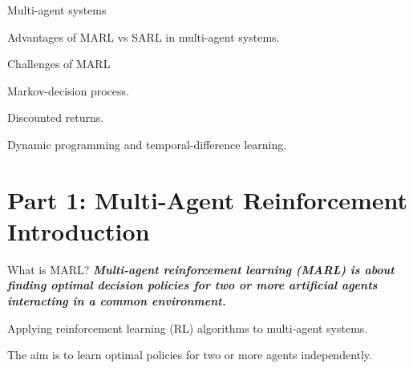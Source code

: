 

\leoslide

\subtitle{Introduction}


\maketitle

\introslide

\begin{frame}{\outline}
    \vspace{10pt}
    \vspace{5pt}
    \blist
        \item Multi-agent systems
        \item Advantages of MARL vs SARL in multi-agent systems.
        \item Challenges of MARL   
    \elist
    \vspace{10pt}
    \vspace{5pt}
    \blist
        \item Markov-decision process.
        \item Discounted returns.
        \item Dynamic programming and temporal-difference learning.
    \elist
\end{frame}

\section{Part 1: Multi-Agent Reinforcement Introduction}

\begin{frame}{What is MARL?}
		\textbf{\textit{Multi-agent reinforcement learning (MARL) is about finding optimal decision policies for two or more artificial agents interacting in a common environment.}}
  \vspace{20pt}
  \blist
    \item Applying reinforcement learning (RL) algorithms to multi-agent systems. 
    \item The aim is to learn optimal policies for two or more agents independently. 
  \elist
\end{frame}

